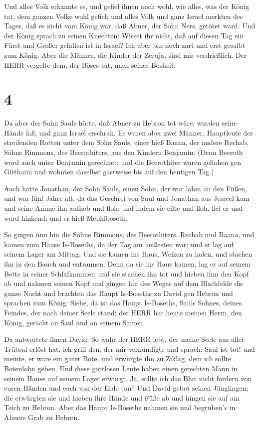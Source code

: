  Und alles Volk erkannte es, und gefiel ihnen auch wohl,
wie alles, was der König tat, dem ganzen Volke wohl gefiel;
 und alles Volk und ganz Israel merkten des Tages, daß es
nicht vom König war, daß Abner, der Sohn Ners, getötet ward.
 Und der König sprach zu seinen Knechten: Wisset ihr nicht,
daß auf diesen Tag ein Fürst und Großer gefallen ist in Israel?
 Ich aber bin noch zart und erst gesalbt zum König. Aber
die Männer, die Kinder der Zeruja, sind mir verdrießlich. Der HERR
vergelte dem, der Böses tut, nach seiner Bosheit.

\hypertarget{section-3}{%
\section{4}\label{section-3}}

 Da aber der Sohn Sauls hörte, daß Abner zu Hebron tot wäre,
wurden seine Hände laß, und ganz Israel erschrak.  Es waren
aber zwei Männer, Hauptleute der streifenden Rotten unter dem Sohn
Sauls; einer hieß Baana, der andere Rechab, Söhne Rimmons, des
Beerothiters, aus den Kindern Benjamin. (Denn Beeroth ward auch unter
Benjamin gerechnet;  und die Beerothiter waren geflohen gen
Gitthaim und wohnten daselbst gastweise bis auf den heutigen Tag.)

 Auch hatte Jonathan, der Sohn Sauls, einen Sohn, der war
lahm an den Füßen, und war fünf Jahre alt, da das Geschrei von Saul und
Jonathan aus Jesreel kam und seine Amme ihn aufhob und floh; und indem
sie eilte und floh, fiel er und ward hinkend; und er hieß Mephiboseth.

 So gingen nun hin die Söhne Rimmons, des Beerothiters,
Rechab und Baana, und kamen zum Hause Is-Boseths, da der Tag am
heißesten war; und er lag auf seinem Lager am Mittag.  Und
sie kamen ins Haus, Weizen zu holen, und stachen ihn in den Bauch und
entrannen.  Denn da sie ins Haus kamen, lag er auf seinem
Bette in seiner Schlafkammer; und sie stachen ihn tot und hieben ihm den
Kopf ab und nahmen seinen Kopf und gingen hin des Weges auf dem
Blachfelde die ganze Nacht  und brachten das Haupt
Is-Boseths zu David gen Hebron und sprachen zum König: Siehe, da ist das
Haupt Is-Boseths, Sauls Sohnes, deines Feindes, der nach deiner Seele
stand; der HERR hat heute meinen Herrn, den König, gerächt an Saul und
an seinem Samen.

 Da antwortete ihnen David: So wahr der HERR lebt, der meine
Seele aus aller Trübsal erlöst hat,  ich griff den, der mir
verkündigte und sprach: Saul ist tot! und meinte, er wäre ein guter
Bote, und erwürgte ihn zu Ziklag, dem ich sollte Botenlohn geben.
 Und diese gottlosen Leute haben einen gerechten Mann in
seinem Hause auf seinem Lager erwürgt. Ja, sollte ich das Blut nicht
fordern von euren Händen und euch von der Erde tun?  Und
David gebot seinen Jünglingen; die erwürgten sie und hieben ihre Hände
und Füße ab und hingen sie auf am Teich zu Hebron. Aber das Haupt
Is-Boseths nahmen sie und begruben's in Abners Grab zu Hebron.


